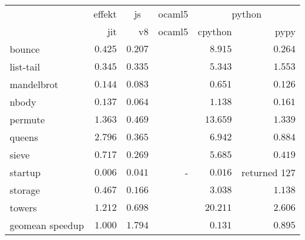\begin{tabular}{l r r r r r}
\toprule & \multicolumn{1}{c}{effekt} & \multicolumn{1}{c}{js} & \multicolumn{1}{c}{ocaml5} & \multicolumn{2}{c}{python} \\
\cmidrule(l){2-2}\cmidrule(l){3-3}\cmidrule(l){4-4}\cmidrule(l){5-6} 
 & jit & v8 & ocaml5 & cpython & pypy \\
\midrule
bounce & $0.425$ & $\mathbf{0.207}$ &  & $8.915$ & $0.264$ \\
list-tail & $0.345$ & $\mathbf{0.335}$ &  & $5.343$ & $1.553$ \\
mandelbrot & $0.144$ & $\mathbf{0.083}$ &  & $0.651$ & $0.126$ \\
nbody & $0.137$ & $\mathbf{0.064}$ &  & $1.138$ & $0.161$ \\
permute & $1.363$ & $\mathbf{0.469}$ &  & $13.659$ & $1.339$ \\
queens & $2.796$ & $\mathbf{0.365}$ &  & $6.942$ & $0.884$ \\
sieve & $0.717$ & $\mathbf{0.269}$ &  & $5.685$ & $0.419$ \\
startup & $\mathbf{0.006}$ & $0.041$ & - & $0.016$ & returned 127 \\
storage & $0.467$ & $\mathbf{0.166}$ &  & $3.038$ & $1.138$ \\
towers & $1.212$ & $\mathbf{0.698}$ &  & $20.211$ & $2.606$ \\
\midrule
 geomean speedup & $1.000$ & $1.794$ &  & $0.131$ & $0.895$ \\
\bottomrule
\end{tabular}